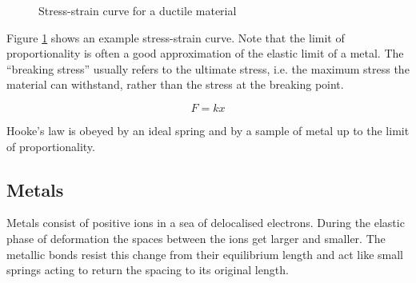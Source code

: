 \documentclass[main.tex]{subfiles}
\begin{document}
\begin{figure}[ht]
    \begin{center}
    \end{center}
    \caption{Stress-strain curve for a ductile material}
    \label{stress-strain}
\end{figure}

Figure \ref{stress-strain} shows an example stress-strain curve. Note that the limit of proportionality is often a good approximation of the elastic limit of a metal. The ``breaking stress'' usually refers to the ultimate stress, i.e. the maximum stress the material can withstand, rather than the stress at the breaking point.


\[ F = kx \]

Hooke's law is obeyed by an ideal spring and by a sample of metal up to the limit of proportionality.


\subsection{Metals}
Metals consist of positive ions in a sea of delocalised electrons. During the elastic phase of deformation the spaces between the ions get larger and smaller. The metallic bonds resist this change from their equilibrium length and act like small springs acting to return the spacing to its original length.
\end{document}
